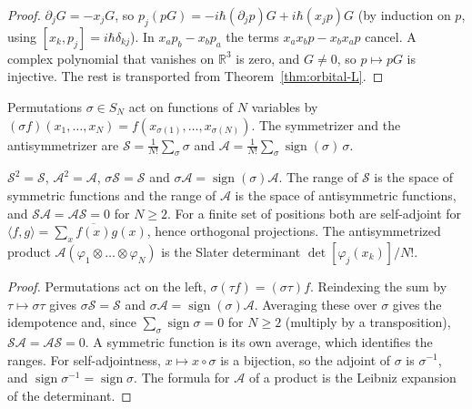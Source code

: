 \begin{proof}\leanok
  $\partial_jG=-x_jG$, so $p_j(pG)=-i\hbar(\partial_jp)G+i\hbar(x_jp)G$ (by induction on $p$, using $[x_k,p_j]=i\hbar\delta_{kj}$). In
  $x_ap_b-x_bp_a$ the terms $x_ax_bp-x_bx_ap$ cancel. A complex polynomial that vanishes on $\mathbb R^3$ is zero, and
  $G\ne0$, so $p\mapsto pG$ is injective. The rest is transported from Theorem~\ref{thm:orbital-L}.
\end{proof}


\begin{definition}\label{def:symmetrizer}
  \leanok
  Permutations $\sigma\in S_N$ act on functions of $N$ variables by $(\sigma f)(x_1,\dots,x_N)=f(x_{\sigma(1)},\dots,x_{\sigma(N)})$.
  The symmetrizer and the antisymmetrizer are $\mathcal S=\frac1{N!}\sum_\sigma\sigma$ and
  $\mathcal A=\frac1{N!}\sum_\sigma\operatorname{sign}(\sigma)\,\sigma$.
\end{definition}

\begin{theorem}\label{thm:symmetrizer}
  \leanok
  $\mathcal S^2=\mathcal S$, $\mathcal A^2=\mathcal A$, $\sigma\mathcal S=\mathcal S$ and $\sigma\mathcal A=\operatorname{sign}(\sigma)\mathcal A$. The range of
  $\mathcal S$ is the space of symmetric functions and the range of $\mathcal A$ is the space of antisymmetric functions, and
  $\mathcal S\mathcal A=\mathcal A\mathcal S=0$ for $N\ge2$. For a finite set of positions both are self-adjoint for
  $\langle f,g\rangle=\sum_x\overline{f(x)}g(x)$, hence orthogonal projections. The antisymmetrized product
  $\mathcal A(\varphi_1\otimes\dots\otimes\varphi_N)$ is the Slater determinant $\det[\varphi_j(x_k)]/N!$.
\end{theorem}
\begin{proof}\leanok
  Permutations act on the left, $\sigma(\tau f)=(\sigma\tau)f$. Reindexing the sum by $\tau\mapsto\sigma\tau$ gives
  $\sigma\mathcal S=\mathcal S$ and $\sigma\mathcal A=\operatorname{sign}(\sigma)\mathcal A$. Averaging these over $\sigma$ gives the idempotence
  and, since $\sum_\sigma\operatorname{sign}\sigma=0$ for $N\ge2$ (multiply by a transposition), $\mathcal S\mathcal A=\mathcal A\mathcal S=0$. A
  symmetric function is its own average, which identifies the ranges. For self-adjointness, $x\mapsto x\circ\sigma$ is a
  bijection, so the adjoint of $\sigma$ is $\sigma^{-1}$, and $\operatorname{sign}\sigma^{-1}=\operatorname{sign}\sigma$. The formula for
  $\mathcal A$ of a product is the Leibniz expansion of the determinant.
\end{proof}

